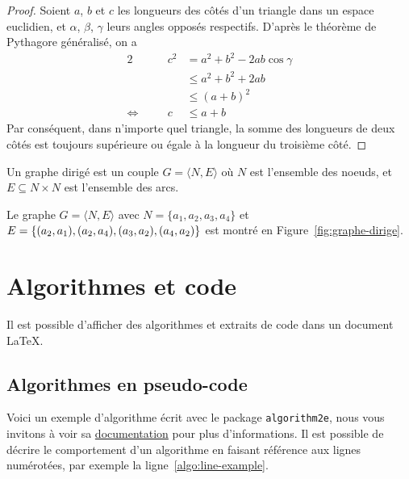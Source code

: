 \documentclass[a4paper, 12pt]{report}
\begin{document}
    \begin{proof}
        Soient $a$, $b$ et $c$ les longueurs des côtés d'un triangle dans un espace euclidien, et $\alpha$, $\beta$, $\gamma$ leurs angles opposés respectifs. D'après le théorème de Pythagore généralisé, on a
        \begin{alignat*}{2}
                                  &  & c^2 & = a^2 + b^2 - 2ab \cos\gamma \\
                                  &  &     & \leq a^2 + b^2 + 2ab         \\
                                  &  &     & \leq (a + b)^2               \\
            \Leftrightarrow \quad &  & c   & \leq a + b
        \end{alignat*}
        Par conséquent, dans n'importe quel triangle, la somme des longueurs de deux côtés est toujours supérieure ou égale à la longueur du troisième côté.
    \end{proof}

    \begin{defn}
    Un graphe dirigé est un couple $G = \langle N, E \rangle$ où $N$ est l'ensemble des noeuds, et $E \subseteq N \times N$ est l'ensemble des arcs.
    \end{defn}
    
    \begin{expl}
    Le graphe $G = \langle N, E\rangle$ avec $N = \{a_1, a_2, a_3, a_4\}$ et $E = \{(a_2, a_1), (a_2, a_4), (a_3, a_2),\linebreak (a_4, a_2)\}$ est montré en Figure~\ref{fig:graphe-dirige}.
    \end{expl}

    \section{Algorithmes et code}
    Il est possible d'afficher des algorithmes et extraits de code dans un document \LaTeX.
    
    \subsection{Algorithmes en pseudo-code}
    
    Voici un exemple d'algorithme écrit avec le package \texttt{algorithm2e}, nous vous invitons à voir sa \href{http://tug.ctan.org/macros/latex/contrib/algorithm2e/doc/algorithm2e.pdf}{documentation} pour plus d'informations. Il est possible de décrire le comportement d'un algorithme en faisant référence aux lignes numérotées, par exemple la ligne~\ref{algo:line-example}.
    
\end{document}
